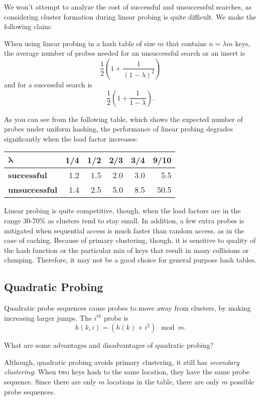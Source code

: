 We won't attempt to analyze the cost of successful and unsuccessful
searches, as considering cluster formation during linear probing is
quite difficult. We make the following claim:

\begin{claim} When using linear probing in a hash table of size $m$
that contains $n = \lambda m$ keys, the average number of probes needed
for an unsuccessful search or an insert is
\[\frac12\left(1 + \frac1{(1-\lambda)^2}\right) \]
and for a successful search is
\[\frac12\left(1 + \frac1{1-\lambda}\right). \]
\end{claim}

As you can see from the following table, which shows the expected
number of probes under uniform hashing, the performance of linear
probing degrades significantly when the load factor increases:

\begin{tabular}{l r r r r r}
\toprule
$\mathbf{\lambda}$    & 1/4 & 1/2 & 2/3 & 3/4 & 9/10 \\ \midrule
\textbf{successful}  & 1.2 & 1.5 & 2.0 & 3.0 &  5.5 \\
\textbf{unsuccessful}& 1.4 & 2.5 & 5.0 & 8.5 & 50.5 \\
\bottomrule
\end{tabular}

Linear probing is quite competitive, though, when the load factors are
in the range 30-70\% as clusters tend to stay small. In addition, a
few extra probes is mitigated when sequential access is much faster
than random access, as in the case of caching.  Because of primary
clustering, though, it is sensitive to quality of the hash function or
the particular mix of keys that result in many collisions or clumping.
Therefore, it may not be a good choice for general purpose hash
tables.

\subsection{Quadratic Probing}

Quadratic probe sequences cause probes to move away from clusters, by
making increasing larger jumps. The $i^{th}$ probe is
\[ h(k,i) = (h(k) + i^2) \mod m.\]

\begin{question}
What are some advantages and disadvantages of quadratic probing?
\end{question}

Although, quadratic probing avoids primary clustering, it still has
\emph{secondary clustering}: When two keys hash to the same location,
they have the same probe sequence. Since there are only $m$ locations
in the table, there are only $m$ possible probe sequences.

